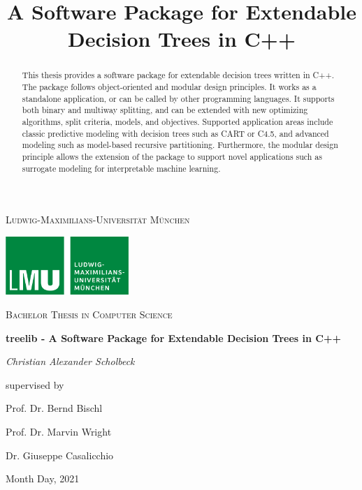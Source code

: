 \documentclass[a4paper, 11pt]{article}
\begin{document}
\title{A Software Package for Extendable Decision Trees in C++}

\begin{titlepage}
	\centering
	\vspace{1cm}
	{\scshape\LARGE Ludwig-Maximilians-Universität München \par}
	\vspace{1.5cm}
	\includegraphics[width=0.35\textwidth]{figure/lmu_logo.png}\par\vspace{1cm}
	\vspace{0.5cm}
	{\scshape\Large Bachelor Thesis in Computer Science\par}
	\vspace{1.5cm}
	{\huge\bfseries treelib - A Software Package for Extendable Decision Trees in C++\par}
	\vspace{2cm}
	{\Large\itshape Christian Alexander Scholbeck\par}
	\vfill
	supervised by\par
	Prof. Dr. Bernd Bischl \par
	Prof. Dr. Marvin Wright \par
	Dr. Giuseppe Casalicchio

	\vfill

	{\large Month Day, 2021 \par}
\end{titlepage}

\newpage
\thispagestyle{empty}

\begin{abstract}
This thesis provides a software package for extendable decision trees written in C++. The package follows object-oriented and modular design principles. It works as a standalone application, or can be called by other programming languages. It supports both binary and multiway splitting, and can be extended with new optimizing algorithms, split criteria, models, and objectives. Supported application areas include classic predictive modeling with decision trees such as CART or C4.5, and advanced modeling such as model-based recursive partitioning. Furthermore, the modular design principle allows the extension of the package to support novel applications such as surrogate modeling for interpretable machine learning.
\end{abstract}
\vspace*{1cm}
\tableofcontents
\clearpage
\setcounter{page}{1}
\end{document}

